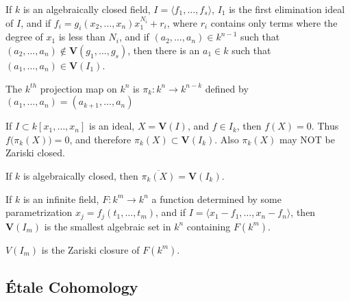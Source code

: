             \begin{theorem}
                If $k$ is an algebraically closed field,
                $I=\langle{f_{1}},\hdots,f_{s}\rangle$, $I_{1}$ is
                the first elimination ideal of $I$, and if
                $f_{i}=g_{i}(x_{2},\hdots,x_{n})x_{1}^{N_i}+r_{i}$,
                where $r_{i}$ contains only terms where the degree
                of $x_{1}$ is less than $N_{i}$, and if
                $(a_{2},\hdots,a_{n})\in{k}^{n-1}$ such that
                $(a_{2},\hdots,a_{n})\notin%
                 \mathbf{V}(g_{1},\hdots,g_{s})$,
                 then there is an $a_1 \in k$ such that
                 $(a_{1},\hdots,a_{n})\in\mathbf{V}(I_1)$.
            \end{theorem}
            \begin{definition}
                The $k^{th}$ projection map on $k^{n}$ is
                $\pi_{k}:k^{n}\rightarrow k^{n-k}$ defined by
                $(a_{1},\hdots,a_{n})=(a_{k+1},\hdots,a_{n})$
            \end{definition}
            \begin{remark}
                If $I\subset{k}[x_{1},\hdots,x_{n}]$ is an ideal,
                $X=\mathbf{V}(I)$, and $f\in{I_{k}}$,
                then $f(X)=0$.
                Thus $f\big(\pi_{k}(X)\big)=0$, and therefore
                $\pi_{k}(X)\subset\mathbf{V}(I_k)$.
                Also $\pi_{k}(X)$ may NOT be Zariski closed.
            \end{remark}
            \begin{theorem}
                If $k$ is algebraically closed,
                then $\overline{\pi_k(X)}=\mathbf{V}(I_k)$.
            \end{theorem}
            \begin{theorem}
                If $k$ is an infinite field,
                $F:k^{m}\rightarrow{k^{n}}$ a function determined
                by some parametrization
                $x_{j}=f_{j}(t_{1},\hdots,t_{m})$, and if
                $I=\langle{x_{1}-f_{1}},\hdots,x_{n}-f_{n}\rangle$,
                then $\mathbf{V}(I_m)$ is the smallest algebraic
                set in $k^{n}$ containing $F(k^{m})$.
            \end{theorem}
            \begin{remark}
                $V(I_{m})$ is the Zariski closure of $F(k^{m})$.
            \end{remark}
        \subsection{\'{E}tale Cohomology}
